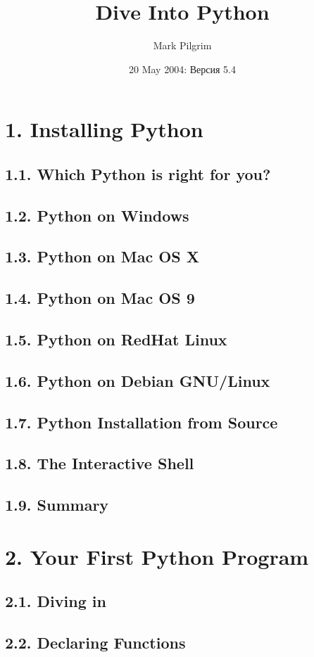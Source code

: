 \documentclass[oneside,12pt]{book}
\author{Mark Pilgrim \email{mark@diveintopython.org}}
\title{Dive Into Python}
\date{20 May 2004: Версия 5.4}
\begin{document}

\tableofcontents
% 

\chapter{1. Installing Python}
\section{1.1. Which Python is right for you?}
\section{1.2. Python on Windows}
\section{1.3. Python on Mac OS X}
\section{1.4. Python on Mac OS 9}
\section{1.5. Python on RedHat Linux}
\section{1.6. Python on Debian GNU/Linux}
\section{1.7. Python Installation from Source}
\section{1.8. The Interactive Shell}
\section{1.9. Summary}
   
\chapter{2. Your First Python Program}
\section{2.1. Diving in}
\section{2.2. Declaring Functions}
\end{document}
